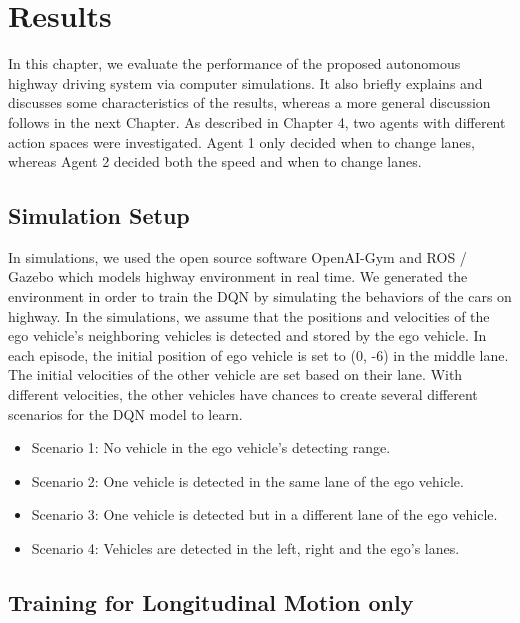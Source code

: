 \chapter{Results}

In this chapter, we evaluate the performance of the proposed autonomous highway driving system via computer simulations. It also briefly explains and discusses some characteristics of the results, whereas a more general discussion follows in the next Chapter. As described in Chapter 4, two agents with different action spaces were investigated. Agent 1 only decided when to change lanes, whereas Agent 2 decided both the speed and when to change lanes.


\section{Simulation Setup}

In simulations, we used the open source software OpenAI-Gym and ROS / Gazebo which models highway environment in real time. We generated the environment in order to train the DQN by simulating the behaviors of the cars on highway. In the simulations, we assume that the positions and velocities of the ego vehicle's neighboring vehicles is detected and stored by the ego vehicle. In each episode, the initial position of ego vehicle is set to (0, -6) in the middle lane. The initial velocities of the other vehicle are set based on their lane. With different velocities, the other vehicles have chances to create several different scenarios for the DQN model to learn.

\begin{itemize}
\item Scenario 1: No vehicle in the ego vehicle's detecting range.
\item Scenario 2: One vehicle is detected in the same lane of the ego vehicle.
\item Scenario 3: One vehicle is detected but in a different lane of the ego vehicle.
\item Scenario 4: Vehicles are detected in the left, right and the ego's lanes.
\end{itemize}

\section{Training for Longitudinal Motion only}

